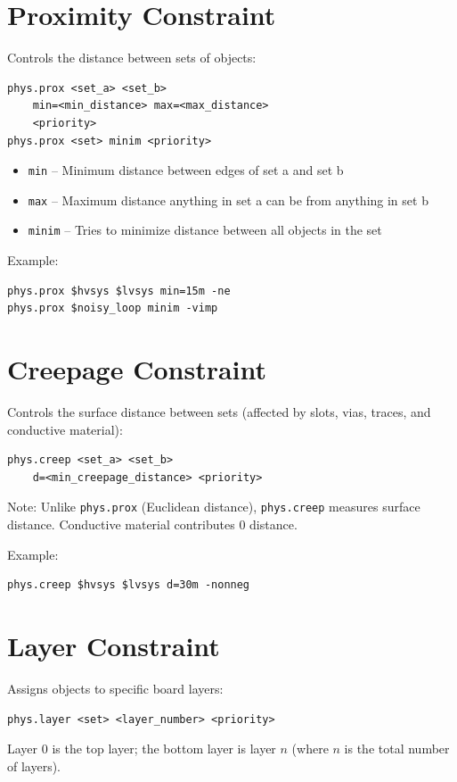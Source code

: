 \documentclass{report}
\begin{document}
\section{Proximity Constraint}
Controls the distance between sets of objects:
\begin{verbatim}
phys.prox <set_a> <set_b> 
    min=<min_distance> max=<max_distance> 
    <priority>
phys.prox <set> minim <priority>
\end{verbatim}
\begin{itemize}
\item \texttt{min} -- Minimum distance between edges of set a and set b
\item \texttt{max} -- Maximum distance anything in set a can be from anything in set b
\item \texttt{minim} -- Tries to minimize distance between all objects in the set
\end{itemize}

Example:
\begin{verbatim}
phys.prox $hvsys $lvsys min=15m -ne
phys.prox $noisy_loop minim -vimp
\end{verbatim}

\section{Creepage Constraint}
Controls the surface distance between sets (affected by slots, vias, traces, and conductive material):
\begin{verbatim}
phys.creep <set_a> <set_b> 
    d=<min_creepage_distance> <priority>
\end{verbatim}

Note: Unlike \texttt{phys.prox} (Euclidean distance), \texttt{phys.creep} measures surface distance. Conductive material contributes 0 distance.

Example:
\begin{verbatim}
phys.creep $hvsys $lvsys d=30m -nonneg
\end{verbatim}

\section{Layer Constraint}
Assigns objects to specific board layers:
\begin{verbatim}
phys.layer <set> <layer_number> <priority>
\end{verbatim}
Layer 0 is the top layer; the bottom layer is layer $n$ (where $n$ is the total number of layers).
\end{document}
